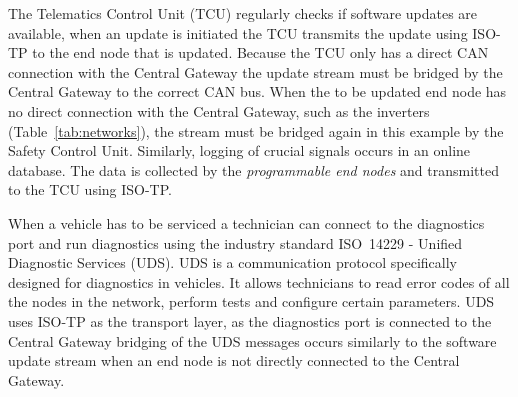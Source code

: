 The Telematics Control Unit (TCU) regularly checks if software updates are available, when an update is initiated the TCU transmits the update using ISO-TP to the end node that is updated. Because the TCU only has a direct CAN connection with the Central Gateway the update stream must be bridged by the Central Gateway to the correct CAN bus. When the to be updated end node has no direct connection with the Central Gateway, such as the inverters (Table~\ref{tab:networks}), the stream must be bridged again in this example by the Safety Control Unit. Similarly, logging of crucial signals occurs in an online database. The data is collected by the \textit{programmable end nodes} and transmitted to the TCU using ISO-TP. 

When a vehicle has to be serviced a technician can connect to the diagnostics port and run diagnostics using the industry standard ISO~14229 - Unified Diagnostic Services (UDS). UDS is a communication protocol specifically designed for diagnostics in vehicles. It allows technicians to read error codes of all the nodes in the network, perform tests and configure certain parameters. UDS uses ISO-TP as the transport layer, as the diagnostics port is connected to the Central Gateway bridging of the UDS messages occurs similarly to the software update stream when an end node is not directly connected to the Central Gateway.

